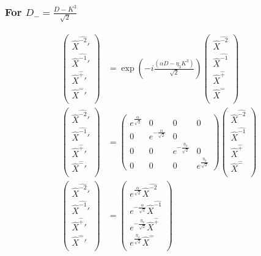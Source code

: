 \documentclass[]{article}
\numberwithin{equation}{section}
\begin{document}
{{\subsubsection{For $D_{-}=\frac{D-K^3}{\sqrt{2}}$}
\begin{align}
\begin{pmatrix}
    \hat{X}^{\hat{-2}}'\\
    \hat{X}^{\hat{-1}}'\\
    \hat{X}^{\hat{+}}'\\
    \hat{X}^{\hat{-}}'\\
    \end{pmatrix}&= \exp{\left(-i\frac{(\alpha D-\eta_{3}K^{3})}{\sqrt{2}}\right)}\begin{pmatrix}
    \hat{X}^{\hat{-2}}\\
    \hat{X}^{\hat{-1}}\\
    \hat{X}^{\hat{+}}\\
    \hat{X}^{\hat{-}}\\
    \end{pmatrix}\\
    \begin{pmatrix}
    \hat{X}^{\hat{-2}}'\\
    \hat{X}^{\hat{-1}}'\\
    \hat{X}^{\hat{+}}'\\
    \hat{X}^{\hat{-}}'\\
    \end{pmatrix}&= \begin{pmatrix}
        e^{\frac{\alpha}{\sqrt{2}}}&0&0&0\\
        0&e^{-\frac{\alpha}{\sqrt{2}}}&0&\\
        0&0&e^{-\frac{\eta_{3}}{\sqrt{2}}}&0\\
        0&0&0&e^{\frac{\eta_{3}}{\sqrt{2}}}
    \end{pmatrix}\begin{pmatrix}
    \hat{X}^{\hat{-2}}\\
    \hat{X}^{\hat{-1}}\\
    \hat{X}^{\hat{+}}\\
    \hat{X}^{\hat{-}}\\
    \end{pmatrix}\\
    \begin{pmatrix}
    \hat{X}^{\hat{-2}}'\\
    \hat{X}^{\hat{-1}}'\\
    \hat{X}^{\hat{+}}'\\
    \hat{X}^{\hat{-}}'\\
    \end{pmatrix}&= \begin{pmatrix}
    e^{\frac{\alpha}{\sqrt{2}}}\hat{X}^{\hat{-2}}\\
    e^{-\frac{\alpha}{\sqrt{2}}}\hat{X}^{\hat{-1}}\\
    e^{-\frac{\eta_{3}}{\sqrt{2}}}\hat{X}^{\hat{+}}\\
    e^{\frac{\eta_{3}}{\sqrt{2}}}\hat{X}^{\hat{-}}\\
    \end{pmatrix}
\end{align}



}}
\end{document}
